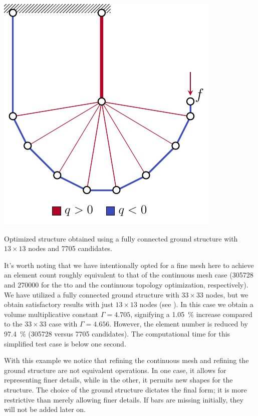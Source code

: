     \begin{marginfigure}
        \centering
        \includegraphics[width=0.8\linewidth]{figures/03_comparison_TO_TTO/12_tto_sol_13/L_tto_opt.pdf}
        \caption{Optimized structure obtained using a fully connected ground structure with $13 \times 13$ nodes and \num[group-separator={$\,$}]{7705} candidates.}
        \label{fig:03_L_tto_13}
    \end{marginfigure}
It's worth noting that we have intentionally opted for a fine mesh here to achieve an element count roughly equivalent to that of the continuous mesh case (\num[group-separator={$\,$}]{305728} and \num[group-separator={$\,$}]{270000} for the \gls{tto} and the continuous topology optimization, respectively). We have utilized a fully connected ground structure with $33 \times 33$ nodes, but we obtain satisfactory results with just $13 \times 13$ nodes (see ). In this case we obtain a volume multiplicative constant $\Gamma=4.705$, signifying a \qty{1.05}{\percent} increase compared to the $33 \times 33$ case with $\Gamma=4.656$. However, the element number is reduced by \qty{97.4}{\percent} (\num[group-separator={$\,$}]{305728} versus \num[group-separator={$\,$}]{7705} candidates). The computational time for this simplified test case is below one second.

With this example we notice that refining the continuous mesh and refining the ground structure are not equivalent operations. In one case, it allows for representing finer details, while in the other, it permits new shapes for the structure. The choice of the ground structure dictates the final form; it is more restrictive than merely allowing finer details. If bars are missing initially, they will not be added later on.

